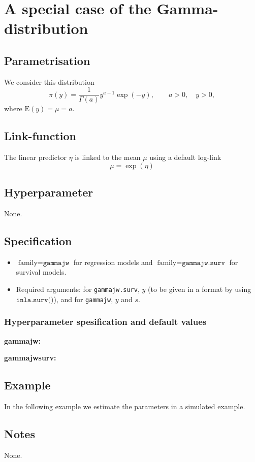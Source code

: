 \documentclass[a4paper,11pt]{article}
\begin{document}
\section*{A special case of the Gamma-distribution}

\subsection*{Parametrisation}

We consider this distribution
\begin{displaymath}
    \pi(y) = \frac{1}{\Gamma(a)} y^{a-1} \exp(-y), \qquad a>0,
    \quad y >0,
\end{displaymath}
where $\text{E}(y) = \mu = a$.

\subsection*{Link-function}

The linear predictor $\eta$ is linked to the mean $\mu$ using a
default log-link
\begin{displaymath}
    \mu = \exp(\eta)
\end{displaymath}

\subsection*{Hyperparameter}

None.

\subsection*{Specification}

\begin{itemize}
\item $\text{family}=\texttt{gammajw}$ for regression models and
    $\text{family}=\texttt{gammajw.surv}$ for survival models.
\item Required arguments: for \texttt{gammajw.surv}, $y$ (to be given in
    a format by using $\texttt{inla.surv()}$), and for \texttt{gammajw},
    $y$ and $s$.
\end{itemize}

\subsubsection*{Hyperparameter spesification and default values}

\textbf{gammajw:}


\textbf{gammajwsurv:}


\subsection*{Example}

In the following example we estimate the parameters in a simulated
example.


\subsection*{Notes}

None.
\end{document}
